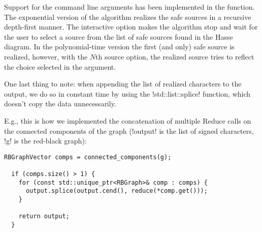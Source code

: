 Support for the command line arguments has been implemented in the function.
The exponential version of the algorithm realizes the safe sources in a recursive depth-first manner.
The interactive option makes the algorithm stop and wait for the user to select a source from the list of safe sources found in the Hasse diagram.
In the polynomial-time version the first (and only) safe source is realized, however, with the $N$th source option, the realized source tries to reflect the choice selected in the argument.

One last thing to note: when appending the list of realized characters to the output, we do so in constant time by using the !std::list::splice! function, which doesn't copy the data unnecessarily.

E.g., this is how we implemented the concatenation of multiple Reduce calls on the connected components of the graph (!output! is the list of signed characters, !g! is the red-black graph):

\begin{lstlisting}[moreemph={RBGraphVector, RBGraph}]
  RBGraphVector comps = connected_components(g);

  if (comps.size() > 1) {
    for (const std::unique_ptr<RBGraph>& comp : comps) {
      output.splice(output.cend(), reduce(*comp.get()));
    }

    return output;
  }
\end{lstlisting}
